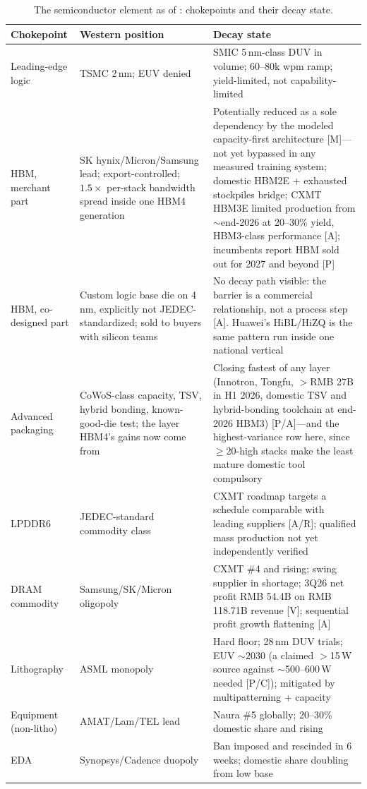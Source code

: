 \begin{table}[htbp]
  \centering
  \small
  \caption{The semiconductor element as of \datafreeze: chokepoints and their decay state.}
  \label{tab:semi-scoreboard}
  \setlength{\tabcolsep}{4pt}
  \begin{tabular}{p{39mm}p{48mm}p{51mm}}
    \toprule
    Chokepoint & Western position & Decay state \\
    \midrule
    Leading-edge logic & TSMC 2\,nm; EUV denied & SMIC 5\,nm-class DUV in volume; 60--80k wpm ramp; yield-limited, not capability-limited \\
    \addlinespace
    HBM, merchant part & SK hynix/Micron/Samsung lead; export-controlled; $1.5\times$ per-stack bandwidth spread inside one HBM4 generation & Potentially reduced as a sole dependency by the modeled capacity-first architecture [M]---not yet bypassed in any measured training system; domestic HBM2E + exhausted stockpiles bridge; CXMT HBM3E limited production from ${\sim}$end-2026 at 20--30\% yield, HBM3-class performance [A]; incumbents report HBM sold out for 2027 and beyond [P] \\
    \addlinespace
    HBM, co-designed part & Custom logic base die on 4\,nm, explicitly not JEDEC-standardized; sold to buyers with silicon teams & No decay path visible: the barrier is a commercial relationship, not a process step [A]. Huawei's HiBL/HiZQ is the same pattern run inside one national vertical \\
    \addlinespace
    Advanced packaging & CoWoS-class capacity, TSV, hybrid bonding, known-good-die test; the layer HBM4's gains now come from & Closing fastest of any layer (Innotron, Tongfu, $>$RMB 27B in H1 2026, domestic TSV and hybrid-bonding toolchain at end-2026 HBM3) [P/A]---and the highest-variance row here, since $\geq$20-high stacks make the least mature domestic tool compulsory \\
    \addlinespace
    LPDDR6 & JEDEC-standard commodity class & CXMT roadmap targets a schedule comparable with leading suppliers [A/R]; qualified mass production not yet independently verified \\
    \addlinespace
    DRAM commodity & Samsung/SK/Micron oligopoly & CXMT \#4 and rising; swing supplier in shortage; 3Q26 net profit RMB 54.4B on RMB 118.71B revenue [V]; sequential profit growth flattening [A] \\
    \addlinespace
    Lithography & ASML monopoly & Hard floor; 28\,nm DUV trials; EUV ${\sim}2030$ (a claimed $>$15\,W source against ${\sim}$500--600\,W needed [P/C]); mitigated by multipatterning + capacity \\
    \addlinespace
    Equipment (non-litho) & AMAT/Lam/TEL lead & Naura \#5 globally; 20--30\% domestic share and rising \\
    \addlinespace
    EDA & Synopsys/Cadence duopoly & Ban imposed and rescinded in 6 weeks; domestic share doubling from low base \\
    \bottomrule
  \end{tabular}
\end{table}

